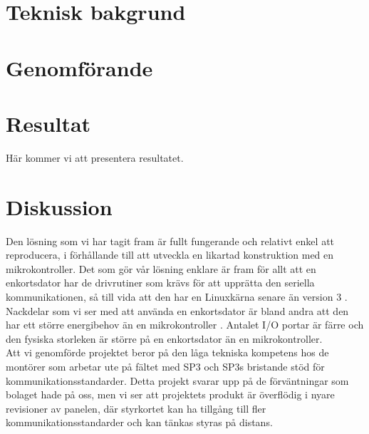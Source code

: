 \documentclass{article}
\begin{document}
	\section{Teknisk bakgrund} %
	\label{sec:teknisk_bakgrund}
	


	\section{Genomförande} %
	\label{sec:genomf_rande}
	

	\section{Resultat} %
	\label{sec:resultat}
	Här kommer vi att presentera resultatet. \\

	\section{Diskussion} %
	\label{sec:sammanfattning}
		Den lösning som vi har tagit fram är fullt fungerande och relativt enkel att reproducera, i förhållande till att utveckla en likartad konstruktion med en mikrokontroller. Det som gör vår lösning enklare är fram för allt att en enkortsdator har de drivrutiner som krävs för att upprätta den seriella kommunikationen, så till vida att den har en Linuxkärna senare än version 3 \citep{silicon}. \\


		\noindent Nackdelar som vi ser med att använda en enkortsdator är bland andra att den har ett större energibehov än en mikrokontroller \citep{gadgetBlog} \citep{rasp}. Antalet I/O portar är färre och den fysiska storleken är större på en enkortsdator än en mikrokontroller.\\

		\noindent Att vi genomförde projektet beror på den låga tekniska kompetens hos de montörer som arbetar ute på fältet med SP3 och SP3s bristande stöd för kommunikationsstandarder. Detta projekt svarar upp på de förväntningar som bolaget hade på oss, men vi ser att projektets produkt är överflödig i nyare revisioner av panelen, där styrkortet kan ha tillgång till fler kommunikationsstandarder och kan tänkas styras på distans.


	\newpage\printbibliography		
\end{document}
